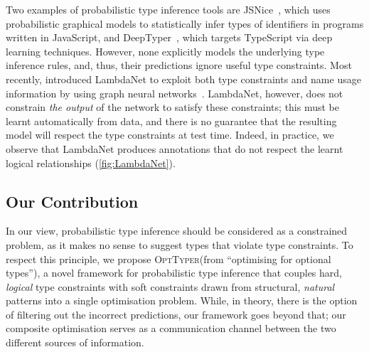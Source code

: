 \documentclass[acmsmall,nonacm]{acmart}\settopmatter{printfolios=true,printccs=false,printacmref=false}
\newcommand{\projectname}{\textsc{OptTyper}\xspace}
\begin{document}
Two examples of probabilistic type inference tools are JSNice~\cite{raychev15},
which uses probabilistic graphical models to statistically infer types of identifiers
in programs written in JavaScript,
and DeepTyper~\cite{hellendoorn18}, which targets TypeScript via deep learning techniques.
However, none explicitly models the underlying
type inference rules, and, thus, their predictions ignore useful type constraints.
%
Most recently, \citet{wei20} introduced LambdaNet to exploit both type constraints and name usage information by using graph neural networks~\citep{allamanis17}. LambdaNet, however, does not constrain 
\emph{the output} of the network to satisfy these constraints;
this must be learnt automatically from data,
and there is no guarantee that the resulting model will respect the type constraints at test time. 
Indeed, in practice, we observe that LambdaNet
produces annotations that do not respect the learnt 
logical relationships (\cref{fig:LambdaNet}).


\subsection{Our Contribution}

In our view, probabilistic type inference should be considered as a constrained problem, as it makes no sense to suggest types that violate type constraints. To respect this principle, we propose \projectname (from ``optimising for optional types''), a novel framework for probabilistic type inference that couples hard, \textit{logical} type constraints with soft constraints drawn from structural, \textit{natural} patterns into a single optimisation problem. While, in theory, there is the option of filtering out the incorrect predictions, our framework goes beyond that; our composite optimisation serves as a communication channel between the two different sources of information. 

\end{document}
